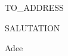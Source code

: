 \documentclass[]{letter}
\begin{document}

\begin{letter}{TO\_ADDRESS}
\address{ Andrina von Burg\newline Gersagstrasse 23 Emmenbrücke}

\opening{SALUTATION}




\signature{}

\closing{Adee}


\end{letter}
\end{document}
